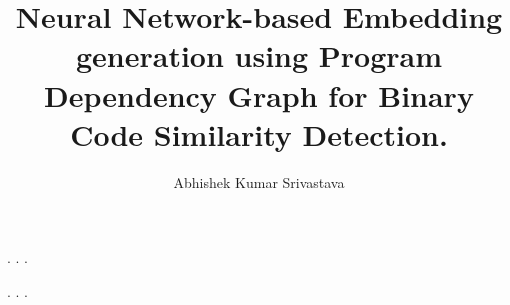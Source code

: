 \documentclass[oneside,final, letterpaper]{ucr}
\begin{document}

\title{Neural Network-based Embedding generation using Program Dependency Graph for Binary Code Similarity Detection.}
\author{Abhishek Kumar Srivastava}

\maketitle
\copyrightpage{}
\approvalpage{}


\begin{frontmatter}

\begin{acknowledgements}
. . .
\end{acknowledgements}

\begin{dedication}
\null\vfil
{\large
\begin{center}
. . . %
\end{center}}
\vfil\null
\end{dedication}



\tableofcontents
\listoffigures
\listoftables
\end{frontmatter}














\end{document}
